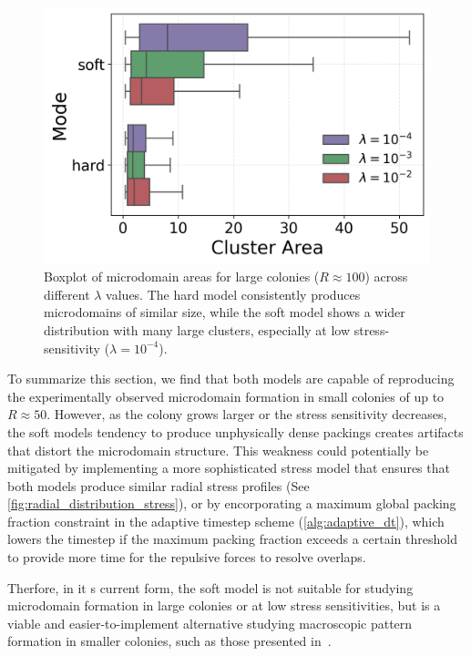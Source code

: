 \documentclass[conference]{IEEEtran}
\begin{document}
\begin{figure}[h]
    \centering
    \includegraphics[width=\linewidth]{figures/comparison_plots/cluster_area_boxplot.png}
    \caption{Boxplot of microdomain areas for large colonies ($R \approx 100$) across different $\lambda$ values. The hard model consistently produces microdomains of similar size, while the soft model shows a wider distribution with many large clusters, especially at low stress-sensitivity ($\lambda = 10^{-4}$).}
    \label{fig:cluster_area_boxplot}
\end{figure}


To summarize this section, we find that both models are capable of reproducing the experimentally observed microdomain formation in small colonies of up to $R \approx 50$. However, as the colony grows larger or the stress sensitivity decreases, the soft models tendency to produce unphysically dense packings creates artifacts that distort the microdomain structure. This weakness could potentially be mitigated by implementing a more sophisticated stress model that ensures that both models produce similar radial stress profiles (See \autoref{fig:radial_distribution_stress}), or by encorporating a maximum global packing fraction constraint in the adaptive timestep scheme (\autoref{alg:adaptive_dt}), which lowers the timestep if the maximum packing fraction exceeds a certain threshold to provide more time for the repulsive forces to resolve overlaps.

Therfore, in it s current form, the soft model is not suitable for studying microdomain formation in large colonies or at low stress sensitivities, but is a viable and easier-to-implement alternative studying macroscopic pattern formation in smaller colonies, such as those presented in~\cite{You2018}.
\end{document}
